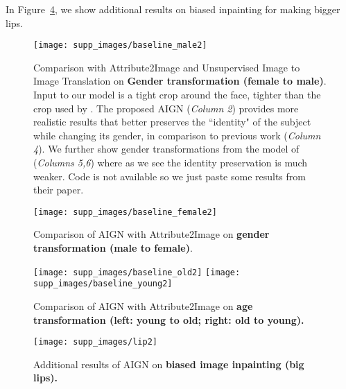 \documentclass[10pt,twocolumn,letterpaper]{article}
\begin{document}
\begin{bibunit}[ieee]
\begin{appendices}
In Figure~\ref{fig:more-lips}, 
we show additional results on biased inpainting for making bigger lips.

\begin{figure}[t]
    \centering
    \texttt{[image: supp\_images/baseline\_male2]}
     \centering
    \caption{Comparison with Attribute2Image \cite{DBLP:journals/corr/YanYSL15} and Unsupervised Image to Image Translation \cite{DBLP:journals/corr/DongNWG17} on \textbf{Gender transformation (female to male)}. Input to our model is a tight crop around the face, tighter than the crop used by \cite{DBLP:journals/corr/YanYSL15}. The proposed AIGN (\textit{Column 2}) provides more realistic results that better preserves the ``identity" of the subject while changing its gender, in comparison to previous work \cite{DBLP:journals/corr/YanYSL15} (\textit{Column 4}). We further show gender transformations from the model of \cite{DBLP:journals/corr/DongNWG17} (\textit{Columns 5,6}) where as we see the identity preservation is much weaker. Code is not available so we just paste some results from their paper. }
    \label{fig:baseline-male}
\end{figure}\begin{figure}[t]
    \centering
    \texttt{[image: supp\_images/baseline\_female2]}
     \centering
    \caption{Comparison of AIGN with Attribute2Image \cite{DBLP:journals/corr/YanYSL15}  on \textbf{gender transformation (male to female)}.}
    \label{fig:baseline-female}
\end{figure}\begin{figure}[t]
    \centering
    \texttt{[image: supp\_images/baseline\_old2]}
    \texttt{[image: supp\_images/baseline\_young2]}
     \centering
    \caption{Comparison of AIGN with Attribute2Image \cite{DBLP:journals/corr/YanYSL15} on \textbf{age transformation (left: young to old; right: old to young).}}
    \label{fig:baseline-old}
\end{figure}\begin{figure}[t]
    \centering
    \texttt{[image: supp\_images/lip2]}
     \centering
    \caption{Additional results  of AIGN on \textbf{biased image inpainting (big lips).}}
    \label{fig:more-lips}
\end{figure}%
\end{appendices}
\putbib[refs]
\end{bibunit}
\end{document}
